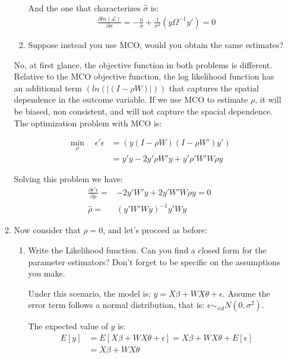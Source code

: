 \documentclass[12pt]{article}
\begin{document}
\begin{enumerate}
\begin{enumerate}
\begin{enumerate}
     And the one that characterizes $\hat{\sigma}$ is:
      \begin{align*}
         \frac{\partial ln(\mathcal{L})}{\partial \sigma} = - \frac{n}{\sigma}+  \frac{1}{\sigma^4} (y \Omega^{-1} y')  = 0
     \end{align*}
     
      \item Suppose instead you use MCO, would you obtain the same estimates? 
    \end{enumerate}  
    
        No, at first glance, the objective function in both problems is different. Relative to the MCO objective function, the log likelihood function has an additional term $(ln(|(I-\rho W)|))$ that captures the spatial dependence in the outcome variable. If we use MCO to estimate $\rho$, it will be biased, non consistent, and will not capture the spacial dependence.
        \\ 
   
        The optimization problem with MCO is:
        
        \begin{align*}
          \min_{\rho} \quad \epsilon'\epsilon &=  (y (I-\rho W) (I-\rho W')  y') \\
          &= y'y- 2y' \rho W' y + y' \rho' W' W \rho y
      \end{align*}
      
        Solving this problem we have:
         \begin{align*}
            \frac{\partial \epsilon'\epsilon}{\partial \rho} =&  -2y'W'y + 2 y'W'W \rho y= 0\\
            \hat{\rho} =& (y'W'Wy)^{-1}y'Wy
         \end{align*}
    \item Now consider that $\rho=0$, and let's proceed as before:
    \begin{enumerate}
      \item Write the Likelihood function. Can you find a closed form for the parameter estimators? Don't forget to be specific on the assumptions you make.
      
      \vspace{0.5cm}
       Under this scenario, the model is: $y=X\beta + WX\theta +\epsilon$. Assume the error term follows a normal distribution, that is: $\epsilon \sim_{iid} N(0,\sigma^2)$.
      
      The expected value of $y$ is:
      \begin{align}
          E[y] &= E[X\beta + WX\theta +\epsilon] = X\beta + WX\theta + E[ \epsilon ] \nonumber\\
          &= X\beta + WX\theta
           \label{ExpectedValue2} 
      \end{align}
      

\end{enumerate}
\end{enumerate}
\end{enumerate}
\end{document}
